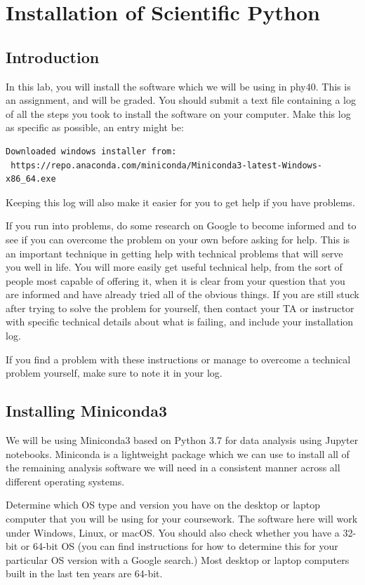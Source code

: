 \chapter{Installation of Scientific Python}

\section{Introduction}

In this lab, you will install the software which we will be using in
phy40. This is an assignment, and will be graded.  You should submit a
text file containing a log of all the steps you took to install the
software on your computer.  Make this log as specific as possible, an
entry might be:
\begin{verbatim}
Downloaded windows installer from:
 https://repo.anaconda.com/miniconda/Miniconda3-latest-Windows-x86_64.exe
\end{verbatim}  
Keeping this log will also make it easier for you to get help if you have problems.

If you run into problems, do some research on Google to become
informed and to see if you can overcome the problem on your own
before asking for help.  This is an important technique in getting
help with technical problems that will serve you well in life.  You
will more easily get useful technical help, from the sort of people
most capable of offering it, when it is clear from your question that
you are informed and have already tried all of the obvious things.  If
you are still stuck after trying to solve the problem for yourself,
then contact your TA or instructor with specific technical details
about what is failing, and include your installation log.

If you find a problem with these instructions or manage to overcome a
technical problem yourself, make sure to note it in your log.

\section{Installing Miniconda3}

We will be using Miniconda3 based on Python 3.7 for data analysis
using Jupyter notebooks.  Miniconda is a lightweight package which we
can use to install all of the remaining analysis software we will need
in a consistent manner across all different operating systems.

Determine which OS type and version you have on the desktop or laptop
computer that you will be using for your coursework.  The software
here will work under Windows, Linux, or macOS.  You should also check
whether you have a 32-bit or 64-bit OS (you can find instructions for
how to determine this for your particular OS version with a Google
search.)  Most desktop or laptop computers built in the last ten years
are 64-bit.

